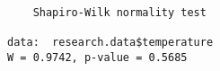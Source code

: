 \begin{verbatim} 

	Shapiro-Wilk normality test

data:  research.data$temperature
W = 0.9742, p-value = 0.5685

\end{verbatim}